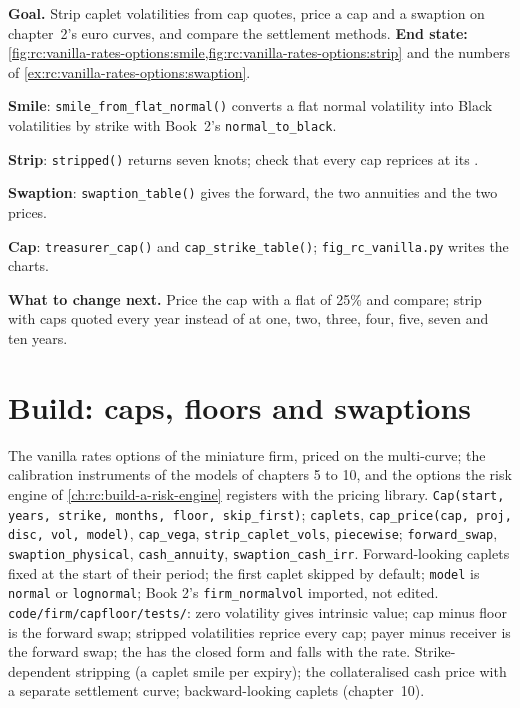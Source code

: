 \begin{tutorial}
\textbf{Goal.} Strip caplet volatilities from cap quotes, price a cap and a
swaption on chapter~2's euro curves, and compare the settlement methods.
\textbf{End state:}
\cref{fig:rc:vanilla-rates-options:smile,fig:rc:vanilla-rates-options:strip} and the
numbers of \cref{ex:rc:vanilla-rates-options:swaption}.
\begin{tutsteps}
\item \textbf{Smile}: \texttt{smile\_from\_flat\_normal()} converts a flat normal
volatility into Black volatilities by strike with Book~2's
\texttt{normal\_to\_black}.
\item \textbf{Strip}: \texttt{stripped()} returns seven knots; check that every
cap reprices at its .
\item \textbf{Swaption}: \texttt{swaption\_table()} gives the forward, the two
annuities and the two prices.
\item \textbf{Cap}: \texttt{treasurer\_cap()} and \texttt{cap\_strike\_table()};
\texttt{fig\_rc\_vanilla.py} writes the charts.
\end{tutsteps}
\textbf{What to change next.} Price the cap with a flat  of
25\% and compare; strip with caps quoted every year instead of at one, two,
three, four, five, seven and ten years.
\end{tutorial}

\section{Build: caps, floors and swaptions}\label{bld:rc:vanilla-rates-options:capfloor}

\begin{build}
 The vanilla rates options of the miniature firm, priced on the
multi-curve; the calibration instruments of the models of chapters 5 to 10, and
the options the risk engine of \cref{ch:rc:build-a-risk-engine} registers with
the pricing library.
 \texttt{Cap(start, years, strike, months, floor, skip\_first)};
\texttt{caplets}, \texttt{cap\_price(cap, proj, disc, vol, model)},
\texttt{cap\_vega}, \texttt{strip\_caplet\_vols}, \texttt{piecewise};
\texttt{forward\_swap}, \texttt{swaption\_physical}, \texttt{cash\_annuity},
\texttt{swaption\_cash\_irr}.
 Forward-looking caplets fixed at the start of their period; the
first caplet skipped by default; \texttt{model} is \texttt{normal} or
\texttt{lognormal}; Book 2's \texttt{firm\_normalvol} imported, not edited.
 \texttt{code/firm/capfloor/tests/}: zero volatility
gives intrinsic value; cap minus floor is the forward swap; stripped
volatilities reprice every cap; payer minus receiver is the forward swap; the
 has the closed form and falls with the rate.
 Strike-dependent stripping (a caplet smile per expiry); the
collateralised cash price with a separate settlement curve; backward-looking
caplets (chapter~10).
\end{build}

